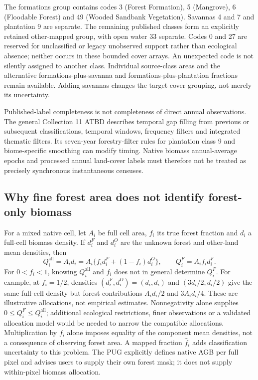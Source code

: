 \documentclass[11pt,a4paper]{article}
\begin{document}
The formations group contains codes 3 (Forest Formation), 5 (Mangrove), 6 (Floodable Forest) and 49 (Wooded Sandbank Vegetation). Savannas 4 and 7 and plantation 9 are separate. The remaining published classes form an explicitly retained other-mapped group, with open water 33 separate. Codes 0 and 27 are reserved for unclassified or legacy unobserved support rather than ecological absence; neither occurs in these bounded cover arrays. An unexpected code is not silently assigned to another class. Individual source-class areas and the alternative formations-plus-savanna and formations-plus-plantation fractions remain available. Adding savannas changes the target cover grouping, not merely its uncertainty.

Published-label completeness is not completeness of direct annual observations. The general Collection 11 ATBD describes temporal gap filling from previous or subsequent classifications, temporal windows, frequency filters and integrated thematic filters. Its seven-year forestry-filter rules for plantation class 9 and biome-specific smoothing can modify timing. Native biomass annual-average epochs and processed annual land-cover labels must therefore not be treated as precisely synchronous instantaneous censuses.

\subsection{Why fine forest area does not identify forest-only biomass}
For a mixed native cell, let $A_i$ be full cell area, $f_i$ its true forest fraction and $d_i$ a full-cell biomass density. If $d_i^F$ and $d_i^O$ are the unknown forest and other-land mean densities, then
\begin{equation}
Q_i^{\mathrm{all}}=A_i d_i=A_i\{f_i d_i^F+(1-f_i)d_i^O\},\qquad Q_i^F=A_i f_i d_i^F.
\end{equation}
For $0<f_i<1$, knowing $Q_i^{\mathrm{all}}$ and $f_i$ does not in general determine $Q_i^F$. For example, at $f_i=1/2$, densities $(d_i^F,d_i^O)=(d_i,d_i)$ and $(3d_i/2,d_i/2)$ give the same full-cell density but forest contributions $A_i d_i/2$ and $3A_i d_i/4$. These are illustrative allocations, not empirical estimates. Nonnegativity alone supplies $0\le Q_i^F\le Q_i^{\mathrm{all}}$; additional ecological restrictions, finer observations or a validated allocation model would be needed to narrow the compatible allocations. Multiplication by $f_i$ alone imposes equality of the component mean densities, not a consequence of observing forest area. A mapped fraction $\widehat f_i$ adds classification uncertainty to this problem. The PUG explicitly defines native AGB per full pixel and advises users to supply their own forest mask; it does not supply within-pixel biomass allocation.
\end{document}
